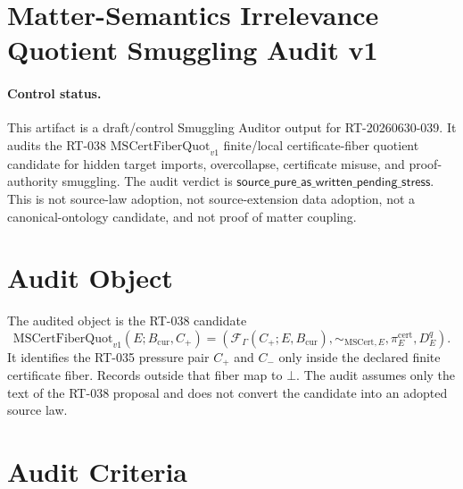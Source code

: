 \section*{Matter-Semantics Irrelevance Quotient Smuggling Audit v1}

\paragraph{Control status.}
This artifact is a draft/control Smuggling Auditor output for
RT-20260630-039. It audits the RT-038
\(\mathrm{MSCertFiberQuot}_{v1}\) finite/local certificate-fiber quotient
candidate for hidden target imports, overcollapse, certificate misuse, and
proof-authority smuggling. The audit verdict is
\(\mathsf{source\_pure\_as\_written\_pending\_stress}\). This is not source-law
adoption, not source-extension data adoption, not a canonical-ontology
candidate, and not proof of matter coupling.

\newcommand{\Bcur}{B_{\mathrm{cur}}}
\newcommand{\MSAdm}{\mathrm{MSAdm}_{v1}}
\newcommand{\MSCertEq}{\sim_{\mathrm{MSCert},E}}
\newcommand{\MSCertQuot}{\mathrm{MSCertFiberQuot}_{v1}}
\newcommand{\NoTarget}{\mathrm{NoTargetImport}_{v1}}
\newcommand{\NoDetector}{\mathrm{NoDetectorImport}_{v1}}
\newcommand{\NoSE}{\mathrm{NoStressEnergyImport}_{v1}}
\newcommand{\NoAction}{\mathrm{NoMatterActionImport}_{v1}}
\newcommand{\AuditPass}{\mathsf{source\_pure\_as\_written\_pending\_stress}}

\newtheorem{definition}{Definition}
\newtheorem{proposition}{Proposition}

\section{Audit Object}

The audited object is the RT-038 candidate
\[
  \MSCertQuot(E;\Bcur,C_+)=
  \left(\mathcal F_{\Gamma}(C_+;E,\Bcur),\MSCertEq,
  \pi^{\mathrm{cert}}_E,D^q_E\right).
\]
It identifies the RT-035 pressure pair \(C_+\) and \(C_-\) only inside the
declared finite certificate fiber. Records outside that fiber map to
\(\bot\). The audit assumes only the text of the RT-038 proposal and does not
convert the candidate into an adopted source law.

\section{Audit Criteria}


